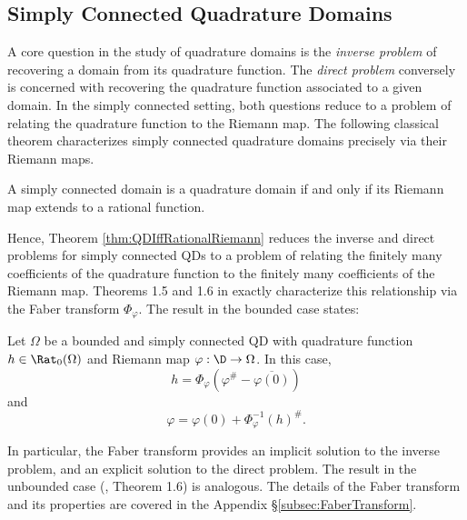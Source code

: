 \documentclass{article}
\numberwithin{equation}{section}
\begin{document}
\subsection{Simply Connected Quadrature Domains}
A core question in the study of quadrature domains is the {\it inverse problem} of recovering a domain from its quadrature function. The {\it direct problem} conversely is concerned with recovering the quadrature function associated to a given domain. In the simply connected setting, both questions reduce to a problem of relating the quadrature function to the Riemann map. The following classical theorem characterizes simply connected quadrature domains precisely via their Riemann maps.
\begin{theorem}\label{thm:QDIffRationalRiemann}
    A simply connected domain is a quadrature domain if and only if its Riemann map extends to a rational function.
\end{theorem}

Hence, Theorem \ref{thm:QDIffRationalRiemann} reduces the inverse and direct problems for simply connected QDs to a problem of relating the finitely many coefficients of the quadrature function to the finitely many coefficients of the Riemann map. Theorems 1.5 and 1.6 in \cite{GravenMakarov2025} exactly characterize this relationship via the Faber transform $\Phi_{\varphi}$. The result in the bounded case states:

\begin{theorem}\label{thm:ClassicBQDRationalRiemannIffQD}
Let $\Omega$ be a bounded and simply connected QD with quadrature function $h\in\Rat_0(\Omega)$ and Riemann map $\varphi:\D\rightarrow\Omega$. In this case,
\begin{equation}\label{eqn:BoundedFaberTransformHFormula}
h=\Phi_{\varphi}\left(\varphi^{\#}-\overline{\varphi(0)}\right)
\end{equation}
and
\begin{equation}\label{eqn:BoundedFaberTransformPhiFormula}
\varphi=\varphi(0)+\Phi_{\varphi}^{-1}(h)^{\#}.
\end{equation}
\end{theorem}
In particular, the Faber transform provides an implicit solution to the inverse problem, and an explicit solution to the direct problem. The result in the unbounded case (\cite{GravenMakarov2025}, Theorem 1.6) is analogous. The details of the Faber transform and its properties are covered in the Appendix \S\ref{subsec:FaberTransform}.\\
\end{document}
